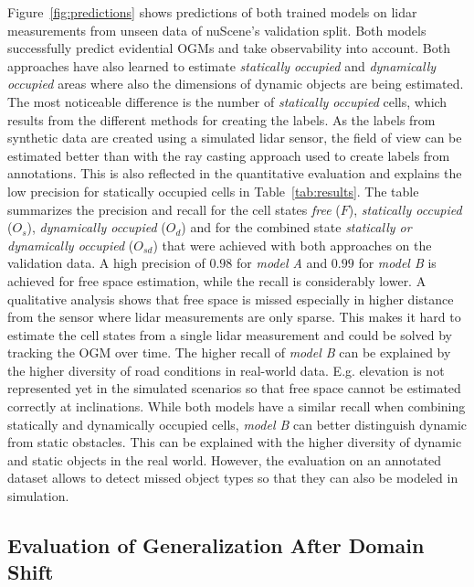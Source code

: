 \documentclass[conference]{IEEEtran}
\begin{document}
Figure~\ref{fig:predictions} shows predictions of both trained models on lidar measurements from unseen data of nuScene's validation split. Both models successfully predict evidential OGMs and take observability into account. Both approaches have also learned to estimate \textit{statically occupied} and \textit{dynamically occupied} areas where also the dimensions of dynamic objects are being estimated. The most noticeable difference is the number of \textit{statically occupied} cells, which results from the different methods for creating the labels. As the labels from synthetic data are created using a simulated lidar sensor, the field of view can be estimated better than with the ray casting approach used to create labels from annotations. This is also reflected in the quantitative evaluation and explains the low precision for statically occupied cells in Table~\ref{tab:results}. The table summarizes the precision and recall for the cell states \textit{free} ($F$), \textit{statically occupied} ($O_s$), \textit{dynamically occupied} ($O_d$) and for the combined state \textit{statically or dynamically occupied} ($O_{sd}$) that were achieved with both approaches on the validation data. A high precision of $0.98$ for \textit{model A} and $0.99$ for \textit{model B} is achieved for free space estimation, while the recall is considerably lower. A qualitative analysis shows that free space is missed especially in higher distance from the sensor where lidar measurements are only sparse. This makes it hard to estimate the cell states from a single lidar measurement and could be solved by tracking the OGM over time. The higher recall of \textit{model B} can be explained by the higher diversity of road conditions in real-world data. E.g. elevation is not represented yet in the simulated scenarios so that free space cannot be estimated correctly at inclinations. While both models have a similar recall when combining statically and dynamically occupied cells, \textit{model B} can better distinguish dynamic from static obstacles. This can be explained with the higher diversity of dynamic and static objects in the real world. However, the evaluation on an annotated dataset allows to detect missed object types so that they can also be modeled in simulation.


\subsection{Evaluation of Generalization After Domain Shift}
\end{document}
